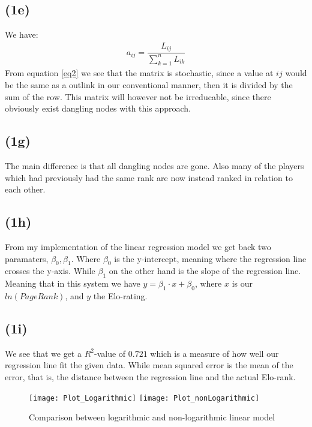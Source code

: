 \documentclass[12pt, letterpaper]{article}
\begin{document}
    \subsection*{(1e)}
      We have:
      \begin{align} \label{eq2}
        a_{ij} = \dfrac{L_{ij}}{\sum_{k=1}^{n}L_{ik}}
      \end{align}
      From equation \ref{eq2} we see that the matrix is stochastic, since a value at $ij$ would be the same as a outlink in our conventional manner, then it is divided by the sum of the row. This matrix will however not be irreducable, since there obviously exist dangling nodes with this approach.
    \subsection*{(1g)}
      The main difference is that all dangling nodes are gone. Also many of the players which had previously had the same rank are now instead ranked in relation to each other.
    \subsection*{(1h)}
      From my implementation of the linear regression model we get back two paramaters, $\beta_0, \beta_1$. Where $\beta_0$ is the y-intercept, meaning where the regression line crosses the y-axis. While $\beta_1$ on the other hand is the slope of the regression line. Meaning that in this system we have $y = \beta_1 \cdot x + \beta_0$, where $x$ is our $ln(PageRank)$, and $y$ the Elo-rating.
    \subsection*{(1i)}
      We see that we get a $R^2$-value of $0.721$ which is a measure of how well our regression line fit the given data. While mean squared error is the mean of the error, that is, the distance between the regression line and the actual Elo-rank.\\
      \begin{figure}[comp]
        \caption{Comparison between logarithmic and non-logarithmic linear model}
        \centering
        \texttt{[image: Plot\_Logarithmic]}
        \texttt{[image: Plot\_nonLogarithmic]}
      \end{figure}





      \begin{align*}
      \end{align*}
\end{document}

